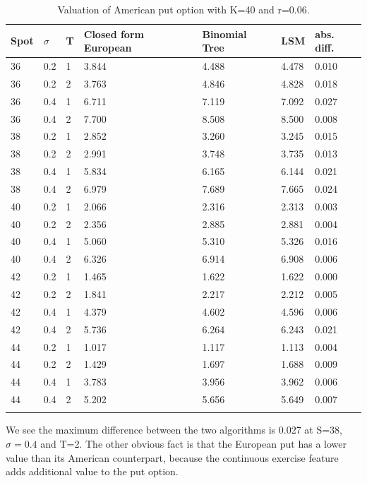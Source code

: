 \begin{table}[H]
\caption{Valuation of American put option with K=40 and r=0.06.}
\label{tab:treatments}
\centering
\begin{tabular}{l l l l l l l }
\toprule
\textbf{Spot} & \textbf{$\sigma$} & \textbf{T} & \textbf{Closed form European} & \textbf{Binomial Tree} & \textbf{LSM} & \textbf{abs. diff.} \\
\midrule
36 & 0.2 & 1 & 3.844 & 4.488 & 4.478 & 0.010\\
36 & 0.2 & 2 & 3.763 & 4.846 & 4.828 & 0.018\\
36 & 0.4 & 1 & 6.711 & 7.119 & 7.092 & 0.027\\
36 & 0.4 & 2 & 7.700 & 8.508 & 8.500 & 0.008\\
38 & 0.2 & 1 & 2.852 & 3.260 & 3.245 & 0.015\\
38 & 0.2 & 2 & 2.991 & 3.748 & 3.735 & 0.013\\
38 & 0.4 & 1 & 5.834 & 6.165 & 6.144 & 0.021\\
38 & 0.4 & 2 & 6.979 & 7.689 & 7.665 & 0.024\\
40 & 0.2 & 1 & 2.066 & 2.316 & 2.313 & 0.003\\
40 & 0.2 & 2 & 2.356 & 2.885 & 2.881 & 0.004\\
40 & 0.4 & 1 & 5.060 & 5.310 & 5.326 & 0.016\\
40 & 0.4 & 2 & 6.326 & 6.914 & 6.908 & 0.006\\
42 & 0.2 & 1 & 1.465 & 1.622 & 1.622 & 0.000\\
42 & 0.2 & 2 & 1.841 & 2.217 & 2.212 & 0.005\\
42 & 0.4 & 1 & 4.379 & 4.602 & 4.596 & 0.006\\
42 & 0.4 & 2 & 5.736 & 6.264 & 6.243 & 0.021\\
44 & 0.2 & 1 & 1.017 & 1.117 & 1.113 & 0.004\\
44 & 0.2 & 2 & 1.429 & 1.697 & 1.688 & 0.009\\
44 & 0.4 & 1 & 3.783 & 3.956 & 3.962 & 0.006\\
44 & 0.4 & 2 & 5.202 & 5.656 & 5.649 & 0.007\\
\bottomrule\\
\end{tabular}
\end{table}
We see the maximum difference between the two algorithms is 0.027 at S=38, $\sigma=0.4$ and T=2. The other obvious fact is that the European put has a lower value than its American counterpart, because the continuous exercise feature adds additional value to the put option. 


